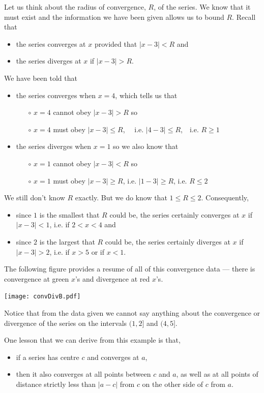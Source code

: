 \begin{eg}
Let us think about the radius of convergence, $R$, of the series. We know that it must exist and the information we have
been given allows us to bound $R$. Recall that
\begin{itemize}
\item the series converges at $x$ provided that $|x-3|<R$ and
\item the series diverges at $x$ if $|x-3|>R$.
\end{itemize}
We have been told that
\begin{itemize}
\item the series converges when $x=4$, which tells us that
\begin{itemize}
\item[$\circ$] $x=4$ cannot obey $|x-3|>R$ so
\item[$\circ$] $x=4$ must obey $|x-3|\le R$, \ \ i.e. $|4-3|\le R$,\ \
 i.e. $R\ge 1$
\end{itemize}
\item the series diverges when $x=1$ so we also know that
\begin{itemize}
\item[$\circ$] $x=1$ cannot obey $|x-3|<R$ so
\item[$\circ$] $x=1$ must obey $|x-3|\ge R$, i.e. $|1-3|\ge R$, i.e. $R\le 2$
\end{itemize}
\end{itemize}
We still don't know $R$ exactly. But we do know that $1\le R\le 2$.
Consequently,
\begin{itemize}
\item since $1$ is the smallest that $R$ could be, the series
certainly converges at $x$ if $|x-3|<1$, i.e. if $2<x<4$ and
\item since $2$ is the largest that $R$ could be, the series
certainly diverges at $x$ if $|x-3|>2$, i.e. if $x>5$ or if $x<1$.
\end{itemize}
The following figure provides a resume of all of this convergence
data --- there is convergence at green $x$'s and divergence at
red $x$'s.
\begin{efig}
\begin{center}
     \texttt{[image: convDivB.pdf]}
\end{center}
\end{efig}
Notice that from the data given we cannot say anything about the
convergence or divergence of the series on the
intervals $(1,2]$ and $(4,5]$.

\noindent
One lesson that we can derive from this example is that,
\begin{itemize}
\item
if a series has centre $c$ and converges at $a$,
\item
then it also converges at all points between $c$ and $a$, as well
as at all points of distance strictly less than $|a-c|$ from $c$
on the other side of $c$ from $a$.
\end{itemize}
\end{eg}



